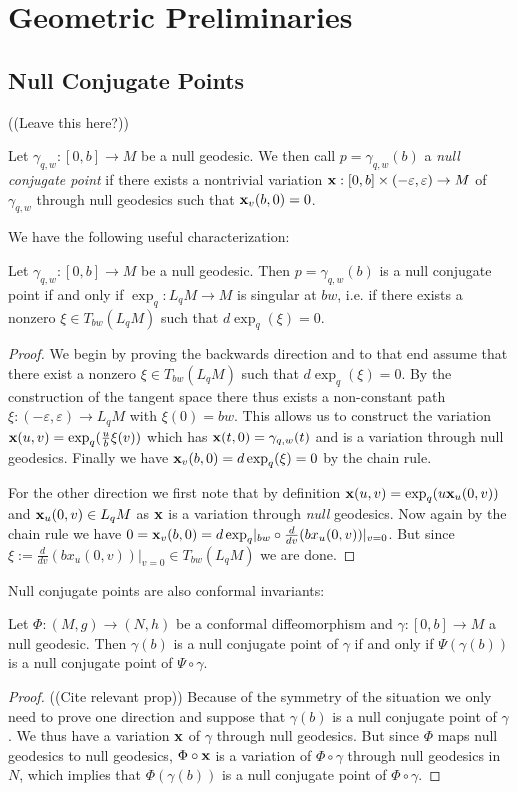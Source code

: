 \chapter{Geometric Preliminaries}

\section{Null Conjugate Points}
((Leave this here?))
\begin{definition}
    Let $\gamma_{q,w}:[0,b]\to M$ be a null geodesic. We then call $p=\gamma_{q,w}(b)$ a \emph{null conjugate point} if there exists a nontrivial variation $\mathbf{x}:[0,b]\times(-\varepsilon,\varepsilon) \to M$ of $\gamma_{q,w}$ through null geodesics such that $\mathbf{x}_v(b,0)=0$.
\end{definition}

We have the following useful characterization:
\begin{proposition}
    Let $\gamma_{q,w}:[0,b]\to M$ be a null geodesic. Then $p=\gamma_{q,w}(b)$ is a null conjugate point if and only if $\exp_q:L_qM\to M$ is singular at $bw$, i.e. if there exists a nonzero $\xi\in T_{bw}(L_qM)$ such that $d\exp_q(\xi)=0$.
\end{proposition}
\begin{proof}
    We begin by proving the backwards direction and to that end assume that there exist a nonzero $\xi\in T_{bw}(L_qM)$ such that $d\exp_q(\xi)=0$. By the construction of the tangent space there thus exists a non-constant path $\xi:(-\varepsilon,\varepsilon)\to L_qM$ with $\xi(0)=bw$. This allows us to construct the variation $\mathbf{x}(u,v)=\exp_q(\frac{u}{b}\xi(v))$ which has $\mathbf{x}(t,0)=\gamma_{q,w}(t)$ and is a variation through null geodesics. Finally we have $\mathbf{x}_v(b,0)=d\exp_q(\xi)=0$ by the chain rule.

    For the other direction we first note that by definition $\mathbf{x}(u,v)=\exp_q(u\mathbf{x}_u(0,v))$ and $\mathbf{x}_u(0,v)\in L_qM$ as $\mathbf{x}$ is a variation through \emph{null} geodesics. 
    Now again by the chain rule we have $0=\mathbf{x}_v(b,0) = d\exp_q\rvert_{bw} \circ \frac{d}{dv}(bx_u(0,v))\rvert_{v=0}$. But since $\xi := \frac{d}{dv}(bx_u(0,v))\rvert_{v=0} \in T_{bw}(L_qM)$ we are done.
\end{proof}

Null conjugate points are also conformal invariants:
\begin{proposition}
    Let $\Phi:(M,g)\to (N,h)$ be a conformal diffeomorphism and $\gamma:[0,b]\to M$ a null geodesic. Then $\gamma(b)$ is a null conjugate point of $\gamma$ if and only if $\Psi(\gamma(b))$ is a null conjugate point of $\Psi \circ \gamma$.
\end{proposition}
\begin{proof}
    ((Cite relevant prop))
    Because of the symmetry of the situation we only need to prove one direction and suppose that $\gamma(b)$ is a null conjugate point of $\gamma$. We thus have a variation $\mathbf{x}$ of $\gamma$ through null geodesics. But since $\Phi$ maps null geodesics to null geodesics, $\Phi\circ \mathbf{x}$ is a variation of $\Phi \circ \gamma$ through null geodesics in $N$, which implies that $\Phi(\gamma(b))$ is a null conjugate point of $\Phi \circ \gamma$.
\end{proof}

